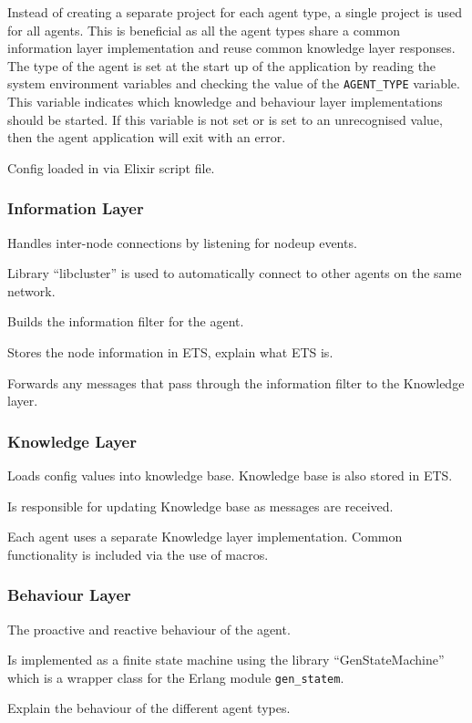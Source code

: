 Instead of creating a separate project for each agent type, a single project is used for all agents.
This is beneficial as all the agent types share a common information layer implementation and reuse common knowledge layer responses.
The type of the agent is set at the start up of the application by reading the system environment variables and checking the value of the \verb|AGENT_TYPE| variable.
This variable indicates which knowledge and behaviour layer implementations should be started.
If this variable is not set or is set to an unrecognised value, then the agent application will exit with an error.

Config loaded in via Elixir script file.

\subsubsection{Information Layer}

Handles inter-node connections by listening for nodeup events.

Library ``libcluster'' is used to automatically connect to other agents on the same network.

Builds the information filter for the agent.

Stores the node information in ETS, explain what ETS is.

Forwards any messages that pass through the information filter to the Knowledge layer.

\subsubsection{Knowledge Layer}

Loads config values into knowledge base.
Knowledge base is also stored in ETS\@.

Is responsible for updating Knowledge base as messages are received.

Each agent uses a separate Knowledge layer implementation.
Common functionality is included via the use of macros.

\subsubsection{Behaviour Layer}

The proactive and reactive behaviour of the agent.

Is implemented as a finite state machine using the library ``GenStateMachine'' which is a wrapper class for the Erlang module \verb|gen_statem|.

Explain the behaviour of the different agent types.
